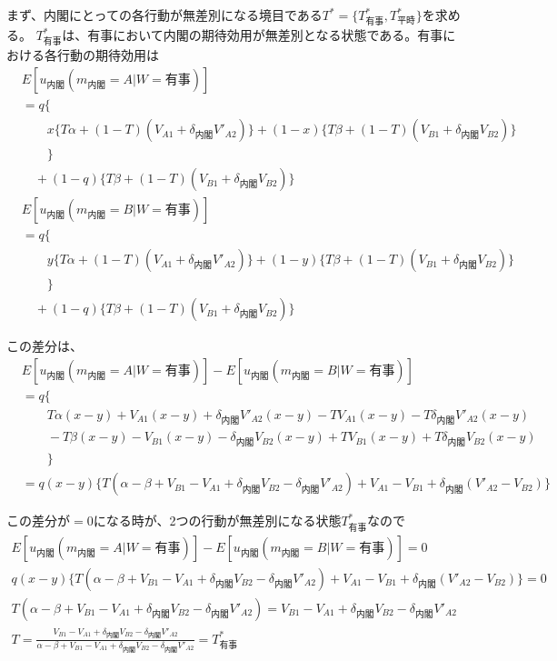 \documentclass[main.tex]{subfiles}
\begin{document}
まず、内閣にとっての各行動が無差別になる境目である$T^* = \lbrace T^*_{有事}, T^*_{平時} \rbrace$を求める。
$T^*_{有事}$は、有事において内閣の期待効用が無差別となる状態である。有事における各行動の期待効用は
\begin{align*}
    & E[u_{内閣}(m_{内閣}=A|W=有事)]\\
    & = q\lbrace \\
    & \quad\quad x \lbrace T\alpha + (1-T)(V_{A1} + \delta_{内閣} V'_{A2}) \rbrace + (1-x)\lbrace T\beta + (1-T)(V_{B1} + \delta_{内閣} V_{B2}) \rbrace \\
    & \quad\quad \rbrace\\
    & \quad +(1-q)\lbrace T\beta + (1-T)(V_{B1} + \delta_{内閣} V_{B2}) \rbrace
\end{align*}
\begin{align*}
    & E[u_{内閣}(m_{内閣}=B|W=有事)]\\
    & = q\lbrace \\
    & \quad\quad y \lbrace T\alpha + (1-T)(V_{A1} + \delta_{内閣} V'_{A2}) \rbrace + (1-y)\lbrace T\beta + (1-T)(V_{B1} + \delta_{内閣} V_{B2}) \rbrace \\
    & \quad\quad \rbrace\\
    & \quad +(1-q)\lbrace T\beta + (1-T)(V_{B1} + \delta_{内閣} V_{B2}) \rbrace
\end{align*}

\noindent
この差分は、
\begin{align*}
    & E[u_{内閣}(m_{内閣}=A|W=有事)] - E[u_{内閣}(m_{内閣}=B|W=有事)]\\
    & = q\lbrace \\
    & \quad\quad T\alpha(x-y) + V_{A1}(x-y) + \delta_{内閣}V'_{A2}(x-y) - TV_{A1}(x-y) - T\delta_{内閣}V'_{A2}(x-y) \\
    & \quad\quad -T\beta(x-y) - V_{B1}(x-y) - \delta_{内閣}V_{B2}(x-y) + TV_{B1}(x-y) + T\delta_{内閣}V_{B2}(x-y)\\
    & \quad\quad  \rbrace\\
    & = q(x-y) \lbrace T(\alpha-\beta + V_{B1}-V_{A1} + \delta_{内閣}V_{B2} - \delta_{内閣}V'_{A2}) 
                +V_{A1} - V_{B1} + \delta_{内閣}(V'_{A2} - V_{B2}) \rbrace
\end{align*}

\noindent
この差分が$=0$になる時が、2つの行動が無差別になる状態$T^*_{有事}$なので
\begin{gather*}
    E[u_{内閣}(m_{内閣}=A|W=有事)] - E[u_{内閣}(m_{内閣}=B|W=有事)] = 0　\\
    q(x-y) \lbrace T(\alpha-\beta + V_{B1}-V_{A1} + \delta_{内閣}V_{B2} - \delta_{内閣}V'_{A2}) 
                +V_{A1} - V_{B1} + \delta_{内閣}(V'_{A2} - V_{B2})  \rbrace = 0 \\
    T(\alpha-\beta + V_{B1}-V_{A1} + \delta_{内閣}V_{B2} - \delta_{内閣}V'_{A2}) 
    = V_{B1} - V_{A1} +\delta_{内閣}V_{B2} - \delta_{内閣}V'_{A2}　\\
    T = \frac{ V_{B1} - V_{A1} +\delta_{内閣}V_{B2} - \delta_{内閣}V'_{A2} }{ \alpha-\beta + V_{B1}-V_{A1} + \delta_{内閣}V_{B2} - \delta_{内閣}V'_{A2} }
        = T^*_{有事}
\end{gather*}
\end{document}
